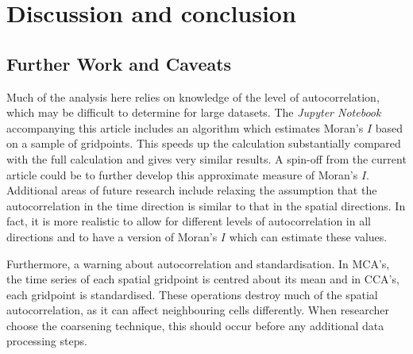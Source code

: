 \documentclass[ijgi,article,submit,moreauthors,pdftex,10pt,a4paper]{Definitions/mdpi}
\begin{document}



\section{Discussion and conclusion}
\label{sec:conclusion}


\subsection{Further Work and Caveats}
\label{sec:Discussion/Further Work}

Much of the analysis here relies on knowledge of the level of autocorrelation, which may be difficult to determine for large datasets. The \textit{Jupyter Notebook} accompanying this article includes an algorithm which estimates Moran's $I$ based on a sample of gridpoints. This speeds up the calculation substantially compared with the full calculation and gives very similar results. A spin-off from the current article could be to further develop this approximate measure of Moran's $I$. Additional areas of future research include relaxing the assumption that the autocorrelation in the time direction is similar to that in the spatial directions. In fact, it is more realistic to allow for different levels of autocorrelation in all directions and to have a version of Moran's $I$ which can estimate these values.

Furthermore, a warning about autocorrelation and standardisation. In MCA's, the time series of each spatial gridpoint is centred about its mean and in CCA's, each gridpoint is standardised. These operations destroy much of the spatial autocorrelation, as it can affect neighbouring cells differently. When researcher choose the coarsening technique, this should occur before any additional data processing steps.
\end{document}
